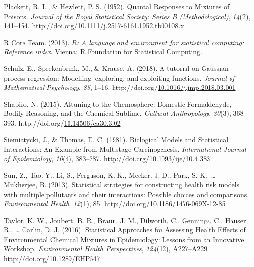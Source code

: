 \documentclass[12pt, twoside]{amherstthesis}
\newenvironment{CSLReferences}[2]%
  {}%
  {\par}
\begin{document}
\begin{CSLReferences}{1}{0}
\leavevmode{}%
Plackett, R. L., \& Hewlett, P. S. (1952). Quantal {Responses} to {Mixtures} of {Poisons}. \emph{Journal of the Royal Statistical Society: Series B (Methodological)}, \emph{14}(2), 141--154. http://doi.org/\href{https://doi.org/10.1111/j.2517-6161.1952.tb00108.x}{10.1111/j.2517-6161.1952.tb00108.x}

\leavevmode{}%
R Core Team. (2013). \emph{R: A language and environment for statistical computing: Reference index}. Vienna: R Foundation for Statistical Computing.

\leavevmode{}%
Schulz, E., Speekenbrink, M., \& Krause, A. (2018). A tutorial on {Gaussian} process regression: {Modelling}, exploring, and exploiting functions. \emph{Journal of Mathematical Psychology}, \emph{85}, 1--16. http://doi.org/\href{https://doi.org/10.1016/j.jmp.2018.03.001}{10.1016/j.jmp.2018.03.001}

\leavevmode{}%
Shapiro, N. (2015). Attuning to the {Chemosphere}: {Domestic} {Formaldehyde}, {Bodily} {Reasoning}, and the {Chemical} {Sublime}. \emph{Cultural Anthropology}, \emph{30}(3), 368--393. http://doi.org/\href{https://doi.org/10.14506/ca30.3.02}{10.14506/ca30.3.02}

\leavevmode{}%
Siemiatycki, J., \& Thomas, D. C. (1981). Biological {Models} and {Statistical} {Interactions}: An {Example} from {Multistage} {Carcinogenesis}. \emph{International Journal of Epidemiology}, \emph{10}(4), 383--387. http://doi.org/\href{https://doi.org/10.1093/ije/10.4.383}{10.1093/ije/10.4.383}

\leavevmode{}%
Sun, Z., Tao, Y., Li, S., Ferguson, K. K., Meeker, J. D., Park, S. K., \ldots{} Mukherjee, B. (2013). Statistical strategies for constructing health risk models with multiple pollutants and their interactions: Possible choices and comparisons. \emph{Environmental Health}, \emph{12}(1), 85. http://doi.org/\href{https://doi.org/10.1186/1476-069X-12-85}{10.1186/1476-069X-12-85}

\leavevmode{}%
Taylor, K. W., Joubert, B. R., Braun, J. M., Dilworth, C., Gennings, C., Hauser, R., \ldots{} Carlin, D. J. (2016). Statistical {Approaches} for {Assessing} {Health} {Effects} of {Environmental} {Chemical} {Mixtures} in {Epidemiology}: {Lessons} from an {Innovative} {Workshop}. \emph{Environmental Health Perspectives}, \emph{124}(12), A227--A229. http://doi.org/\href{https://doi.org/10.1289/EHP547}{10.1289/EHP547}


\end{CSLReferences}
\end{document}
